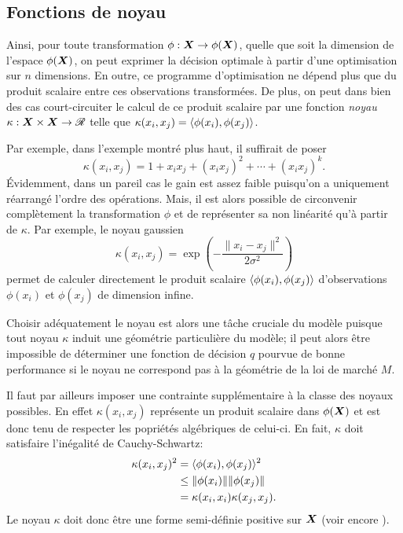 \subsection{Fonctions de noyau}

Ainsi, pour toute transformation $\phi:\bm{X}\to\phi(\bm{X})$, quelle que soit la dimension de l'espace
$\phi(\bm{X})$, on peut exprimer la décision optimale à partir d'une optimisation sur $n$
dimensions. En outre, ce programme d'optimisation ne dépend plus que du produit scalaire
entre ces observations transformées. De plus, on peut dans bien des cas court-circuiter le
calcul de ce produit scalaire par une fonction \textit{noyau} $\kappa:\bm{X}\times\bm{X} \to \mathscr{R}$ telle que
$\kappa(x_i,x_j) = \langle\phi(x_i),\phi(x_j)\rangle$.

Par exemple, dans l'exemple montré plus haut, il suffirait de poser
\begin{equation}
  \kappa(x_i,x_j) = 1 + x_ix_j + (x_ix_j)^2 + \cdots + (x_ix_j)^k.
\end{equation}
Évidemment, dans un pareil cas le gain est assez faible puisqu'on a uniquement réarrangé
l'ordre des opérations. Mais, il est alors possible de circonvenir complètement la
transformation $\phi$ et de représenter sa non linéarité qu'à partir de $\kappa$.  Par exemple, le
noyau gaussien
\begin{equation}
  \kappa(x_i,x_j) = \exp\left(-\frac{\|x_i-x_j\|^2}{2\sigma^2}\right)
\end{equation}
permet de calculer directement le produit scalaire $\langle\phi(x_i),\phi(x_j)\rangle$ d'observations
$\phi(x_i)$ et $\phi(x_j)$ de dimension infine.

Choisir adéquatement le noyau est alors une tâche cruciale du modèle puisque tout noyau
$\kappa$ induit une géométrie particulière du modèle; il peut alors être impossible de
déterminer une fonction de décision $q$ pourvue de bonne performance si le noyau ne
correspond pas à la géométrie de la loi de marché $M$.

Il faut par ailleurs imposer une contrainte supplémentaire à la classe des noyaux
possibles. En effet $\kappa(x_i,x_j)$ représente un produit scalaire dans $\phi(\bm{X})$ et est donc
tenu de respecter les popriétés algébriques de celui-ci. En fait, $\kappa$ doit satisfaire
l'inégalité de Cauchy-Schwartz:
\begin{align}
  \kappa(x_i,x_j)^2 &= \langle\phi(x_i),\phi(x_j)\rangle^2\\
               &\leq \|\phi(x_i)\|\|\phi(x_j)\|\\
               &= \kappa(x_i,x_i)\kappa(x_j,x_j).
\end{align}
Le noyau $\kappa$ doit donc être une forme semi-définie positive sur $\bm{X}$ (voir encore
\cite{mohri2012foundations}).


